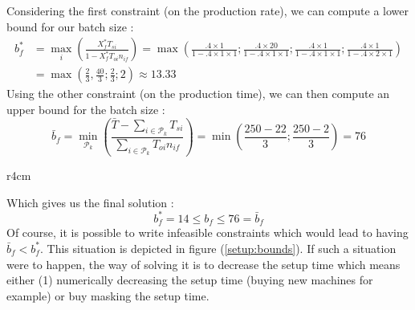 Considering the first constraint (on the production rate), we can compute a lower bound for our batch size :
\[
    \begin{split}
        b_f^* &= \max_i\left( \frac{X_f^*T_{si}}{1-X_f^*T_{oi}n_{if}} \right) =
        \max\left( \frac{.4\times 1}{1-.4\times 1\times 1} ; \frac{.4\times 20}{1-.4\times 1\times 1} ; \frac{.4\times 1}{1-.4\times 1\times 1} ; \frac{.4\times 1}{1-.4\times 2\times 1} \right)\\
        &= \max\left( \frac 23, \frac{40}3 ; \frac 23 ; 2 \right) \approx 13.33
    \end{split}
\]
Using the other constraint (on the production time), we can then compute an upper bound for the batch size :
\[
    \bar b_f = \min_{\mathcal P_k}\left( \frac{\bar T - \sum_{i\in\mathcal P_k} T_{si}}{\sum_{i\in\mathcal P_k}T_{oi}n_{if}} \right) = \min\left( \frac{250 - 22}{3} ; \frac{250 - 2}{3} \right) = 76
\]

\begin{wrapfigure}[10]{r}{4cm}
    \centering
    \caption{\label{setup:bounds}Batch size}
\end{wrapfigure}

Which gives us the final solution : \[ b_f^* = 14 \le b_f \le 76 = \bar b_f \]
Of course, it is possible to write infeasible constraints which would lead to having $\bar b_f < b_f^*$. This situation is depicted in figure (\ref{setup:bounds}). If such a situation were to happen, the way of solving it is to decrease the setup time which means either (1) numerically decreasing the setup time (buying new machines for example) or buy masking the setup time. 